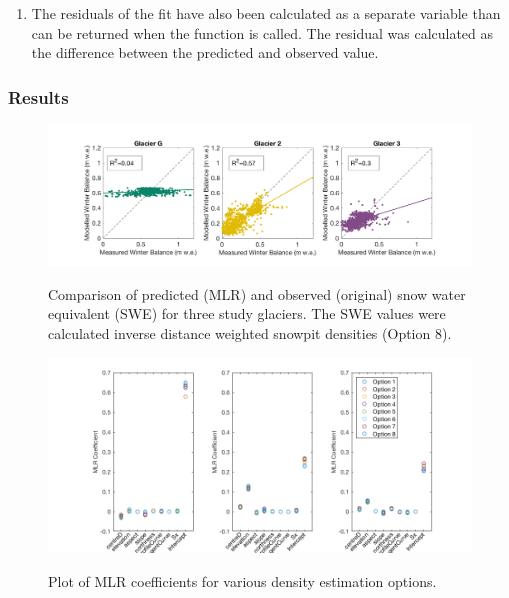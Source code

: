 \documentclass[12pt]{article}
\begin{document}
\begin{enumerate}
\item The residuals of the fit have also been calculated as a separate variable than can be returned when the function is called. The residual was calculated as the difference between the predicted and observed value. 
\end{enumerate}


\subsubsection{Results}

\begin{landscape}
\begin{figure}
	\centering
	\includegraphics[height = 0.4\textwidth]{MLRfit_opt8.png}\\
	\caption{Comparison of predicted (MLR) and observed (original) snow water equivalent (SWE) for three study glaciers. The SWE values were calculated inverse distance weighted snowpit densities (Option 8).}
	\label{fig:MLRfit_opt8}
\end{figure}

\begin{figure}
	\centering
	\includegraphics[height = 0.4\textwidth]{MLRcoeff_compare.png}\\
	\caption{Plot of MLR coefficients for various density estimation options.}
	\label{fig:MLRcoeff_compare}
\end{figure}

\pagebreak


\end{landscape}
\end{document}
